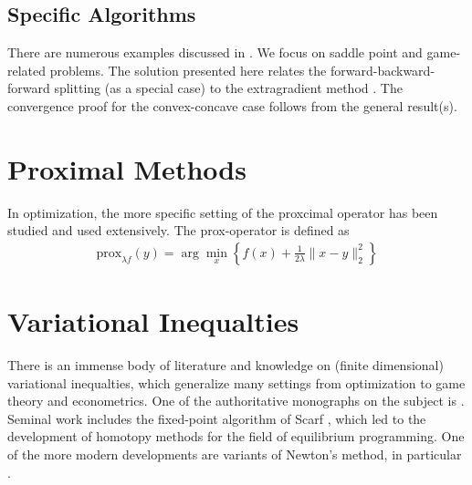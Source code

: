 \documentclass{article}
\begin{document}
\subsection{Specific Algorithms}

There are numerous examples discussed in  \cite[Section 7.5]{ryu2016primer}. We focus on saddle point and game-related problems. The solution presented here relates the forward-backward-forward splitting (as a special case) to the extragradient method \cite[Section 7.5, p.~41]{ryu2016primer}. The convergence proof for the convex-concave case follows from the general result(s). 

\section{Proximal Methods}

In optimization, the more specific setting of the proxcimal operator has been studied and used extensively. The prox-operator is defined as
\begin{align}
\text{prox}_{\lambda f}(y) = \arg\min_x \left\{ f(x) + \frac 1{2\lambda} \| x - y \|^2_2 \right\}
\end{align}

\section{Variational Inequalties}

There is an immense body of literature and knowledge on (finite dimensional) variational inequalties, which generalize many settings from optimization to game theory and econometrics. One of the authoritative monographs on the subject is \cite{facchinei2007finite}. Seminal work includes the fixed-point algorithm of Scarf \cite{scarf1967approximation}, which led to the development of homotopy methods for the field of equilibrium programming. One of the more modern developments are variants of Newton's method, in particular \cite{de1996semismooth}. 



\end{document}
